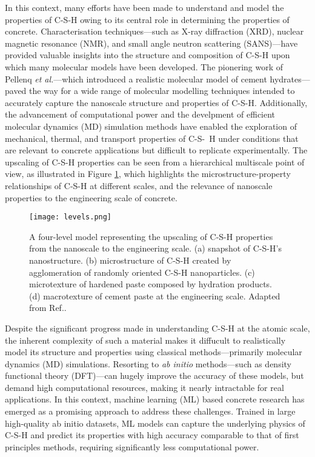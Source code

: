 In this context, many efforts have been made to understand and model the properties of C-S-H owing to its central role in determining the properties of concrete\supercite{Ji2012,Papatzani2015,Qomi2020}. Characterisation techniques---such as X-ray diffraction (XRD)\supercite{Allen2007, Houston2009,Oh2012}, nuclear magnetic resonance (NMR)\supercite{Foley2012,Maddalena2019}, and small angle neutron scattering (SANS)---have provided valuable insights into the structure and composition of C-S-H upon which many molecular models have been developed. The pionering work of Pellenq \emph{et al.}\supercite{Pellenq2009}---which introduced a realistic molecular model of cement hydrates---paved the way for a wide range of molecular modelling techniques\supercite{AbdolhosseiniQomi2014,Richardson2014,Bauchy2014,Kovacevic2016, KunhiMohamed2018} intended to accurately capture the nanoscale structure and properties of C-S-H. Additionally, the advancement of computational power and the develpment of efficient molecular dynamics (MD) simulation methods have enabled the exploration of mechanical, thermal, and transport properties of C-S-~H\supercite{
AbdolhosseiniQomi2015, Bahraq2022, Cho2020, Barbhuiya2023} under conditions that are relevant to concrete applications but difficult to replicate experimentally. The upscaling of C-S-H properties can be seen from a hierarchical multiscale point of view, as illustrated in Figure \ref{fig:figure1}, which highlights the microstructure-property relationships of C-S-H at different scales, and the relevance of nanoscale properties to the engineering scale of concrete.
\begin{figure}[H]
    \centering
    \texttt{[image: levels.png]}
    \caption{A four-level model representing the upscaling of C-S-H properties from the nanoscale to the engineering scale. (a) snapshot of C-S-H's nanostructure. (b) microstructure of C-S-H created by agglomeration of randomly oriented C-S-H nanoparticles. (c) microtexture of hardened paste composed by hydration products. (d) macrotexture of cement paste at the engineering scale. Adapted from Ref.\supercite{AbdolhosseiniQomi2015}.}
    \label{fig:figure1}
\end{figure}

Despite the significant progress made in understanding C-S-H at the atomic scale, the inherent complexity of such a material makes it diffucult to realistically model its structure and properties using classical methods---primarily molecular dynamics (MD) simulations. Resorting to \emph{ab initio} methods---such as density functional theory (DFT)---can hugely improve the accuracy of these models, but demand high computational resources, making it nearly intractable for real applications\supercite{zotero-item-16}. In this context, machine learning (ML) based concrete research has emerged as a promising approach to address these challenges\supercite{zotero-item-16, Kobayashi2021, Zhu2024}. Trained in large high-quality {ab initio} datasets, ML models can capture the underlying physics of C-S-H and predict its properties with high accuracy comparable to that of first principles methods, requiring significantly less computational power. 
 


